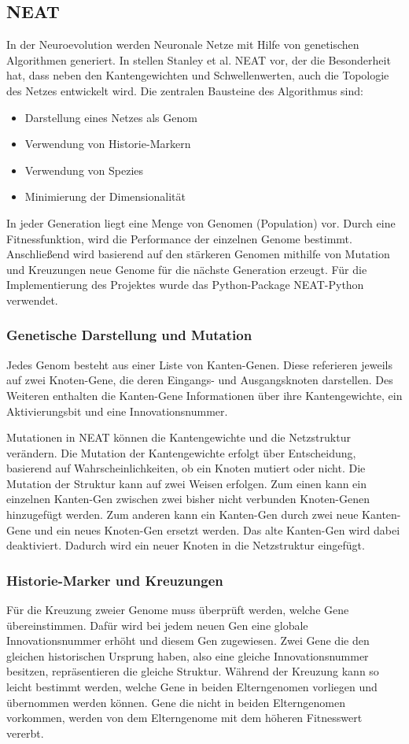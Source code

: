 \documentclass[11pt,final,journal,a4paper,towside,towcolumn]{IEEEtran}
\begin{document}
\subsection{NEAT}
In der Neuroevolution werden Neuronale Netze mit Hilfe von genetischen Algorithmen generiert. In \cite{stanley:gecco02-efficient} stellen Stanley et al. \ac{NEAT} vor, der die Besonderheit hat, dass neben den Kantengewichten und Schwellenwerten, auch die Topologie des Netzes entwickelt wird.
Die zentralen Bausteine des Algorithmus sind:
\begin{itemize}
\item Darstellung eines Netzes als Genom	
\item Verwendung von Historie-Markern
\item Verwendung von Spezies
\item Minimierung der Dimensionalität
\end{itemize}
In jeder Generation liegt eine Menge von Genomen (Population) vor. Durch eine Fitnessfunktion, wird die Performance der einzelnen Genome bestimmt. Anschließend wird basierend auf den stärkeren Genomen mithilfe von Mutation und Kreuzungen neue Genome für die nächste Generation erzeugt. 
Für die Implementierung des Projektes wurde das Python-Package NEAT-Python \cite{python-neat} verwendet.
\subsubsection{Genetische Darstellung und Mutation}
Jedes Genom besteht aus einer Liste von Kanten-Genen. Diese referieren jeweils auf zwei Knoten-Gene, die deren Eingangs- und Ausgangsknoten darstellen. Des Weiteren enthalten die Kanten-Gene Informationen über ihre Kantengewichte, ein Aktivierungsbit und eine Innovationsnummer. 

Mutationen in \ac{NEAT} können die Kantengewichte und die Netzstruktur verändern. Die Mutation der Kantengewichte erfolgt über Entscheidung, basierend auf Wahrscheinlichkeiten, ob ein Knoten mutiert oder nicht. Die Mutation der Struktur kann auf zwei Weisen erfolgen. Zum einen kann ein einzelnen Kanten-Gen zwischen zwei bisher nicht verbunden Knoten-Genen hinzugefügt werden. Zum anderen kann ein Kanten-Gen durch zwei neue Kanten-Gene und ein neues Knoten-Gen ersetzt werden. Das alte Kanten-Gen wird dabei deaktiviert. Dadurch wird ein neuer Knoten in die Netzstruktur eingefügt.
\subsubsection{Historie-Marker und Kreuzungen}
Für die Kreuzung zweier Genome muss überprüft werden, welche Gene übereinstimmen. Dafür wird bei jedem neuen Gen eine globale Innovationsnummer erhöht und diesem Gen zugewiesen. Zwei Gene die den gleichen historischen Ursprung haben, also eine gleiche Innovationsnummer besitzen, repräsentieren die gleiche Struktur. Während der Kreuzung kann so leicht bestimmt werden, welche Gene in beiden Elterngenomen vorliegen und übernommen werden können. Gene die nicht in beiden Elterngenomen vorkommen, werden von dem Elterngenome mit dem höheren Fitnesswert vererbt.
\end{document}
